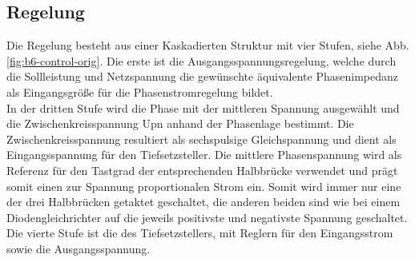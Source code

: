 		\subsection{Regelung}
			Die Regelung besteht aus einer Kaskadierten Struktur mit vier Stufen, siehe Abb. \ref{fig:b6-control-orig}. Die erste ist die Ausgangsspannungsregelung, welche durch die Sollleistung und Netzspannung die gewünschte äquivalente Phasenimpedanz als Eingangsgröße für die Phasenstromregelung bildet.\\
			In der dritten Stufe wird die Phase mit der mittleren Spannung ausgewählt und die Zwischenkreisspannung \gls{Upn} anhand der Phasenlage bestimmt. Die Zwischenkreisspannung resultiert als sechspulsige Gleichspannung und dient als Eingangsspannung für den Tiefsetzsteller. Die mittlere Phasenspannung wird als Referenz für den Tastgrad der entsprechenden Halbbrücke verwendet und prägt somit einen zur Spannung proportionalen Strom ein. Somit wird immer nur eine der drei Halbbrücken getaktet geschaltet, die anderen beiden sind wie bei einem Diodengleichrichter auf die jeweils positivste und negativste Spannung geschaltet.
			Die vierte Stufe ist die des Tiefsetzstellers, mit Reglern für den Eingangsstrom sowie die Ausgangsspannung.
			
